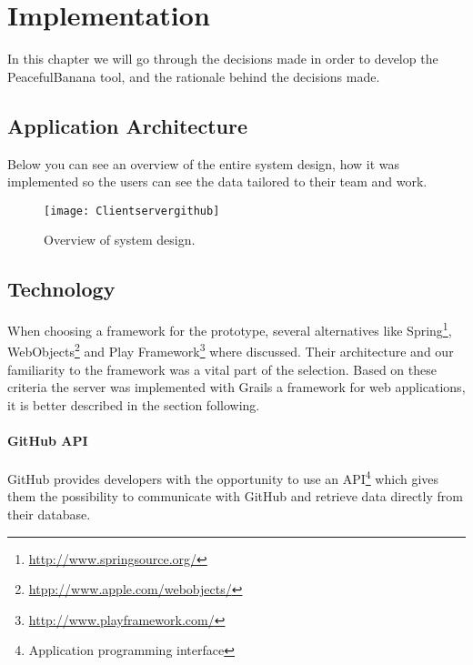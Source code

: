 \chapter{Implementation}
\label{chap:implementation}
In this chapter we will go through the decisions made in order to develop the PeacefulBanana tool, and the rationale behind the decisions made. 

\section{Application Architecture}
Below you can see an overview of the entire system design, how it was implemented so the users can see the data tailored to their team and work.

\begin{figure}[H]
    \centering
        \texttt{[image: Clientservergithub]}
    \caption{Overview of system design.}
    \label{ClientServerGithub}
\end{figure}

\section{Technology}
When choosing a framework for the prototype, several alternatives like Spring\footnote{\url{http://www.springsource.org/}}, WebObjects\footnote{\url{htpp://www.apple.com/webobjects/}} and Play Framework\footnote{\url{http://www.playframework.com/}} where discussed. Their architecture and our familiarity to the framework was a vital part of the selection. Based on these criteria the server was implemented with Grails a framework for web applications, it is better described in the section following.

\subsubsection{GitHub API}
GitHub provides developers with the opportunity to use an API\footnote{Application programming interface} which gives them the possibility to communicate with GitHub and retrieve data directly from their database.  

